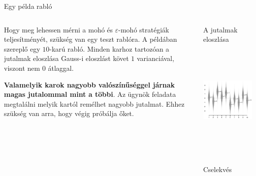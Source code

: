\documentclass[english, aspectratio=169]{beamer}
\begin{document}
\begin{frame}{Egy példa rabló}
\begin{columns}
\begin{column}{.5\textwidth}
Hogy meg lehessen mérni a mohó és $\varepsilon$-mohó stratégiák teljesítményét, szükség van egy teszt rablóra. A példában szereplő egy $10$-karú rabló. Minden karhoz tartozóan a jutalmak eloszlása Gauss-i eloszlást követ $1$ varianciával, viszont nem $0$ átlaggal. \par\smallskip
\textbf{Valamelyik karok nagyobb valószínűséggel járnak magas jutalommal mint a többi}. Az ügynök feladata megtalálni melyik kartól remélhet nagyobb jutalmat. Ehhez szükség van arra, hogy végig próbálja őket.
\end{column}
\begin{column}{.5\textwidth}
\begin{center}
A jutalmak eloszlása
\includegraphics[width=7cm, height=6cm, keepaspectratio]{images/solving_6.png}
\begin{scriptsize}
Cselekvés
\end{scriptsize}
\end{center}
\end{column}
\end{columns}
\end{frame}
\end{document}
